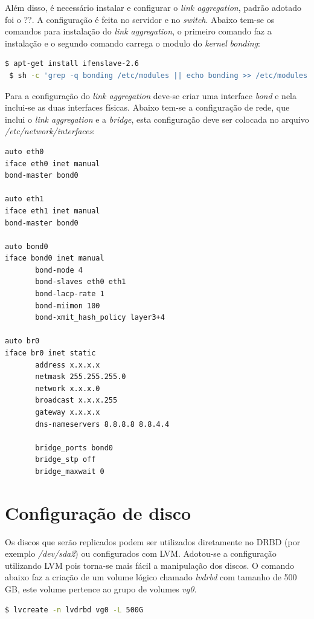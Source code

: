 Além disso, é necessário instalar e configurar o \textit{link aggregation}, padrão adotado foi o ??. A configuração é feita no servidor e 
no \textit{switch}. Abaixo tem-se os comandos para instalação do \textit{link aggregation}, o primeiro comando faz a instalação
e o segundo comando carrega o modulo do \textit{kernel} \textit{bonding}:
\begin{lstlisting}[language=bash]
 $ apt-get install ifenslave-2.6
 $ sh -c 'grep -q bonding /etc/modules || echo bonding >> /etc/modules'
\end{lstlisting}

Para a configuração do \textit{link aggregation} deve-se criar uma interface \textit{bond} e nela inclui-se as duas interfaces físicas.
Abaixo tem-se a configuração de rede, que inclui o \textit{link aggregation} e a \textit{bridge}, esta configuração deve ser colocada no 
arquivo \textit{/etc/network/interfaces}:
\begin{lstlisting}[language=bash]
auto eth0
iface eth0 inet manual
bond-master bond0

auto eth1
iface eth1 inet manual
bond-master bond0

auto bond0
iface bond0 inet manual
       bond-mode 4
       bond-slaves eth0 eth1
       bond-lacp-rate 1
       bond-miimon 100
       bond-xmit_hash_policy layer3+4

auto br0
iface br0 inet static
       address x.x.x.x
       netmask 255.255.255.0
       network x.x.x.0
       broadcast x.x.x.255
       gateway x.x.x.x
       dns-nameservers 8.8.8.8 8.8.4.4
       
       bridge_ports bond0
       bridge_stp off
       bridge_maxwait 0
\end{lstlisting}

\section{Configuração de disco}

Os discos que serão replicados podem ser utilizados diretamente no \ac{DRBD} (por exemplo \textit{/dev/sda2}) ou configurados com \ac{LVM}. Adotou-se
a configuração utilizando \ac{LVM} pois torna-se mais fácil a manipulação dos discos. O comando abaixo faz a criação de um volume lógico chamado 
\textit{lvdrbd} com tamanho de 500 GB, este volume pertence ao grupo de volumes \textit{vg0}.
\begin{lstlisting}[language=bash]
 $ lvcreate -n lvdrbd vg0 -L 500G
\end{lstlisting}

